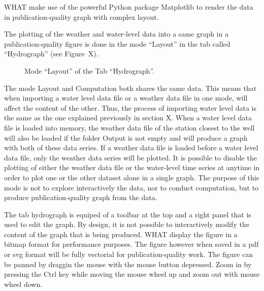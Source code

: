 \documentclass[WHATMANUAL.tex]{subfiles}
\begin{document}
WHAT make use of the powerful Python package Matplotlib to render the data in publication-quality graph with complex layout.

The plotting of the weather and water-level data into a same graph in a publication-quality figure is done in the mode ``Layout'' in the tab called ``Hydrograph'' (see Figure~X).

\begin{figure}[h!]
	\setlength{\fboxsep}{0pt}
	\centering
	\caption[Mode ``Layout'' of the Tab ``Hydrograph'']{Mode ``Layout'' of the Tab ``Hydrograph''.}
	\label{fig:tab_hydrograph_layout}
\end{figure}

The mode Layout and Computation both shares the same data. This means that when importing a water level data file or a weather data file in one mode, will affect the content of the other. Thus, the process of importing water level data is the same as the one explained previously in section X. When a water level data file is loaded into memory, the weather data file of the station closest to the well will also be loaded if the folder Output is not empty and will produce a graph with both of these data series. If a weather data file is loaded before a water level data file, only the weather data series will be plotted. It is possible to disable the plotting of either the weather data file or the water-level time series at anytime in order to plot one or the other dataset alone in a single graph. The purpose of this mode is not to explore interactively the data, nor to conduct computation, but to produce publication-quality graph from the data.

The tab hydrograph is equiped of a toolbar at the top and a right panel that is used to edit the graph. By design, it is not possible to interactively modify the content of the graph that is being produced. WHAT display the figure in a bitmap format for performance purposes. The figure however when saved in a pdf or svg format will be fully vectorial for publication-quality work. The figure can be panned by draggin the mouse with the mouse button depressed. Zoom in by pressing the Ctrl key while moving the mouse wheel up and zoom out with mouse wheel down.
\end{document}
